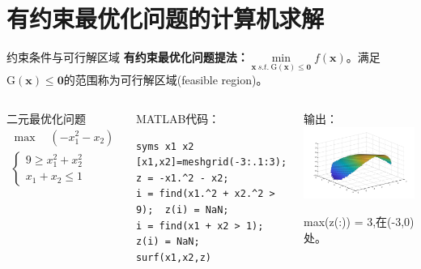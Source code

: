 \documentclass[10pt]{beamer}
\begin{document}
\section{有约束最优化问题的计算机求解}
		\begin{frame}[fragile]{约束条件与可行解区域}
			\textbf{有约束最优化问题提法：}$\min\limits_{\mathbf{x}\ s.t.\ \mathrm{G}(\mathbf{x}) \leqslant \mathbf{0}} f(\mathbf{x})$。满足$\mathrm{G}(\mathbf{x}) \leqslant \mathbf{0}$的范围称为可行解区域(feasible region)。
			
		\begin{columns}[T]
				
		\begin{example}[6-15]
			二元最优化问题$
			\begin{array}{l}
			\max \quad \left(-x_{1}^{2}-x_{2}\right)\\
			\left\{\begin{array}{l}
			9 \geqslant x_{1}^{2}+x_{2}^{2} \\
			x_{1}+x_{2} \leqslant 1
			\end{array}\right.
			\end{array}
			$
		\end{example}
				
	\begin{block}{MATLAB代码：}
\begin{lstlisting}
syms x1 x2
[x1,x2]=meshgrid(-3:.1:3);
z = -x1.^2 - x2;
i = find(x1.^2 + x2.^2 > 9);  z(i) = NaN;
i = find(x1 + x2 > 1);  z(i) = NaN;
surf(x1,x2,z)
\end{lstlisting}
	\end{block}	
				
				
	\begin{block}{输出：}
\centering
\includegraphics[width=\textwidth]{31}

max(z(:)) = 3,在(-3,0)处。
	\end{block}
		\end{columns}			
\end{frame}
\end{document}
